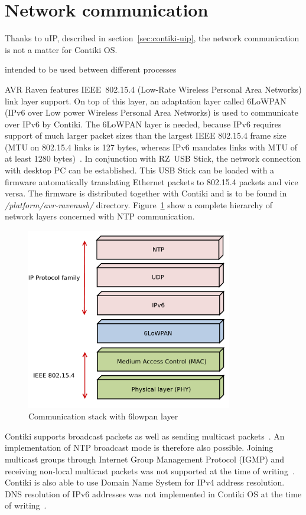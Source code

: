 
\section{Network communication}
Thanks to uIP, described in section~\ref{sec:contiki-uip},
the network communication is not a matter for Contiki OS.

intended to be used between different processes

AVR Raven features IEEE~802.15.4 (Low-Rate Wireless Personal Area Networks) link layer support.
On top of this layer, an adaptation layer called 6LoWPAN (IPv6 over Low power Wireless Personal Area Networks)
is used to communicate over IPv6 by Contiki.
The 6LoWPAN layer is needed, because IPv6 requires support of much larger packet
sizes than the largest IEEE 802.15.4 frame size
(MTU on 802.15.4 links is 127 bytes,
whereas IPv6 mandates links with MTU of at least 1280 bytes)~\cite{interconnecting}.
In conjunction with RZ~USB Stick, the network connection with desktop PC can be established.
This USB Stick can be loaded with a firmware automatically translating
Ethernet packets to 802.15.4 packets and vice versa.
The firmware is distributed together with Contiki and
is to be found in {\it{/platform/avr-ravenusb/}} directory.
Figure~\ref{fig:design-6lowpan} show a complete hierarchy of network layers
concerned with NTP communication.
\begin{figure}
  \centering
  \includegraphics[width=9cm,keepaspectratio]{fig/6lowpan.pdf}
  \caption{Communication stack with 6lowpan layer}
  \label{fig:design-6lowpan}
  \bigskip
\end{figure}

Contiki supports broadcast packets as well as sending multicast packets~\cite{contiki-docs}.
An implementation of NTP broadcast mode is therefore also possible.
Joining multicast groups through Internet Group Management Protocol (IGMP)
and receiving non-local multicast packets
was not supported at the time of writing~\cite{contiki-docs}.
Contiki is also able to use Domain Name System for IPv4 address resolution.
DNS resolution of IPv6 addresses was not implemented in Contiki OS
at the time of writing~\cite{contiki-docs}.
